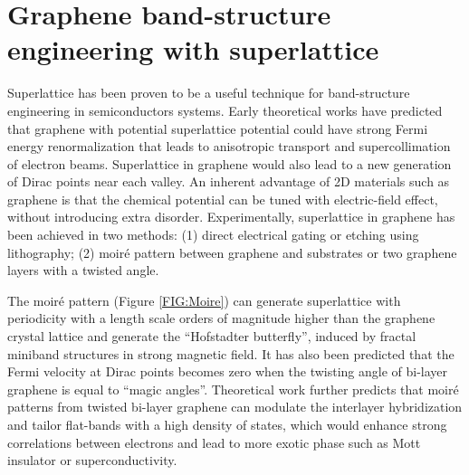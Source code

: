 \documentclass[pdflatex, sectionletters, 12pt]{pittetd}    %
\begin{document}
\section{Graphene band-structure engineering with superlattice}

Superlattice has been proven to be a useful technique for band-structure engineering in semiconductors systems\cite{tsu2010superlattice}. Early theoretical works have predicted that graphene with potential superlattice potential could have strong Fermi energy renormalization that leads to anisotropic transport\cite{park2008anisotropic} and supercollimation of electron beams\cite{park2008electron}. Superlattice in graphene would also lead to a new generation of Dirac points near each valley\cite{park2008new}. An inherent advantage of 2D materials such as graphene is that the chemical potential can be tuned with electric-field effect, without introducing extra disorder\cite{cao2018correlated}. Experimentally, superlattice in graphene has been achieved in two methods: (1) direct electrical gating or etching using lithography\cite{dubey2013tunable, forsythe2018band, jessen2019lithographic}; (2) moir{\'e} pattern between graphene and substrates\cite{dean2013hofstadter, hunt2013massive, ponomarenko2013cloing} or two graphene layers with a twisted angle\cite{cao2016superlattice, cao2018correlated, cao2018unconventional, chen2018gate, yankowitz2018dynamic}. 

The moir{\'e} pattern (Figure \ref{FIG:Moire}) can generate superlattice with periodicity with a length scale orders of magnitude higher than the graphene crystal lattice and generate the ``Hofstadter butterfly'', induced by fractal miniband structures in strong magnetic field\cite{dean2013hofstadter, hunt2013massive, ponomarenko2013cloing}. It has also been predicted\cite{bistritzer2011moire} that the Fermi velocity at Dirac points becomes zero when the twisting angle of bi-layer graphene is equal to ``magic angles''. Theoretical work\cite{bistritzer2011moire, suarez2010flat, lopes2012continuum} further predicts that moir{\'e} patterns from twisted bi-layer graphene can modulate the interlayer hybridization and tailor flat-bands with a high density of states, which would enhance strong correlations between electrons and lead to more exotic phase such as Mott insulator\cite{cao2016superlattice, cao2018correlated, chen2018gate} or superconductivity\cite{cao2018unconventional}.
\end{document}
